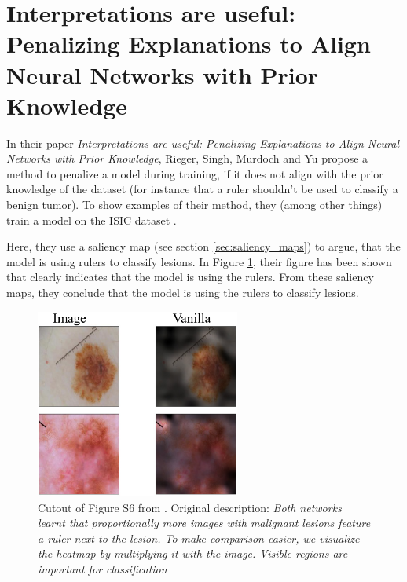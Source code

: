 \section{Interpretations are useful: Penalizing Explanations to Align Neural Networks with Prior Knowledge}\label{sec:interps-are-useful}
In their paper \textit{Interpretations are useful: Penalizing Explanations to Align Neural Networks with Prior Knowledge}\cite{interps-are-useful},
Rieger, Singh, Murdoch and Yu propose a method to penalize a model during training,
if it does not align with the prior knowledge of the dataset (for instance that a ruler shouldn't be used to classify a benign tumor).
To show examples of their method, they (among other things) train a model on the ISIC dataset \cite{ISIC_Dataset_2018}.

Here, they use a saliency map (see section \ref{sec:saliency_maps}) to argue,
that the model is using rulers to classify lesions.
In Figure \ref{fig:interps-are-useful-saliency-maps},
their figure has been shown that clearly indicates that the model is using the rulers.
From these saliency maps, they conclude that the model is using the rulers to classify lesions.
\begin{figure}[h]
    \centering
    \includegraphics[width=0.6\textwidth]{./images/interps-are-useful-saliency-maps.png}
    \caption[Cutout of Figure S6 from \cite{interps-are-useful}.]{ 
        Cutout of Figure S6 from \cite{interps-are-useful}. Original description: \textit{
        Both networks learnt that proportionally more images with malignant lesions feature a ruler next to the lesion. To make
        comparison easier, we visualize the heatmap by multiplying it with the image. Visible regions are important for classification
    }}
    \label{fig:interps-are-useful-saliency-maps}
\end{figure}